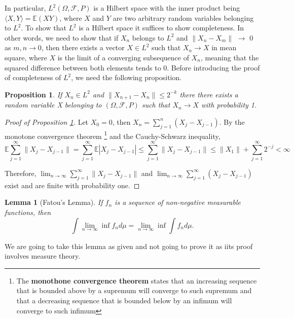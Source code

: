 \documentclass{article}
\newtheorem{prop}{Proposition}
\newtheorem{lemma}{Lemma}
\begin{document}
In particular, $L^2(\Omega, \mathscr{F}, P)$ is a Hilbert space with the inner product being $\langle X, Y \rangle = \mathbb E(XY)$, where $X$ and $Y$ are two arbitrary random variables belonging to $L^2$. To show that $L^2$ is a Hilbert space it suffices to show completeness. In other words, we need to show that if $X_n$ belongs to $L^2$ and $\lVert X_n - X_m \rVert$ $\rightarrow$ 0 as $m, n \rightarrow 0$, then there exists a vector $X \in L^2$ such that $X_n \rightarrow X$ in mean square, where $X$ is the limit of a converging subsequence of ${X_n}$, meaning that the squared difference between both elements tends to 0. Before introducing the proof of completeness of $L^2$, we need the following proposition.\newline

\begin{prop} \label{prop:lc}
If $X_n \in L^2$ and $\lVert X_{n+1} - X_n \rVert \leqslant 2^{-k}$ there there exists a random variable X belonging to $(\Omega, \mathscr{F}, P)$ such that $X_n \rightarrow X$ with probability 1.
\end{prop}

\begin{proof}[Proof of Proposition \ref{prop:lc}]
Let $X_0 = 0$, then $X_n = \sum_{j=1}^{n}(X_j - X_{j-1})$. By the monotone convergence theorem \footnote{The \textbf {monothone convergence theorem} states that an increasing sequence that is bounded above by a supremum will converge to such supremum and that a decreasing sequence that is bounded below by an infimum will converge to such infimum} and the Cauchy-Schwarz inequality,
\[
\mathbb E \sum_{j=1}^{\infty} \lVert X_j - X_{j-1}\rVert = \sum_{j=1}^{\infty} \mathbb E \left| X_j - X_{j-1}\right| \leqslant \sum_{j=1}^{\infty} \lVert X_j - X_{j-1} \rVert \leqslant \lVert X_1 \rVert + \sum_{j=1}^{\infty} 2^{-j} < \infty
\]

Therefore, $\lim_{n\to\infty} \sum_{j=1}^{\infty} \lVert X_j - X_{j-1} \rVert$ and $\lim_{n\to\infty} \sum_{j=1}^{\infty} (X_j - X_{j-1})$ exist and are finite with probability one. \newline
\end{proof}


\begin{lemma}[Fatou's Lemma]
If ${f_n}$ is a sequence of non-negative measurable functions, then 
\[
\int \lim_{n\to\infty} \inf f_n d\mu = \lim_{n\to\infty} \inf \int f_n d\mu. 
\]
\end{lemma}
We are going to take this lemma as given and not going to prove it as iits proof involves measure theory. \newline
\end{document}
